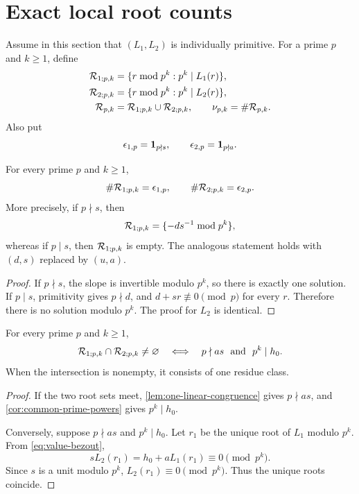 \section{Exact local root counts}
\label{sec:local-root-counts}

Assume in this section that \((L_1,L_2)\) is individually primitive.
For a prime \(p\) and \(k\ge1\), define
\begin{align}
 \mathcal R_{1;p,k}
 &=
 \{r\bmod p^k:p^k\mid L_1(r)\},
\notag\\
 \mathcal R_{2;p,k}
 &=
 \{r\bmod p^k:p^k\mid L_2(r)\},
\notag\\
 \mathcal R_{p,k}
 &=\mathcal R_{1;p,k}\cup\mathcal R_{2;p,k},
 \qquad
 \nu_{p,k}=\#\mathcal R_{p,k}.
\label{eq:local-root-sets}
\end{align}
Also put
\[
 \epsilon_{1,p}=\mathbf 1_{p\nmid s},\qquad
 \epsilon_{2,p}=\mathbf 1_{p\nmid a}.
\]

\begin{lemma}
\label{lem:one-linear-congruence}
For every prime \(p\) and \(k\ge1\),
\[
 \#\mathcal R_{1;p,k}=\epsilon_{1,p},
 \qquad
 \#\mathcal R_{2;p,k}=\epsilon_{2,p}.
\]
More precisely, if \(p\nmid s\), then
\[
 \mathcal R_{1;p,k}
 =
 \{-ds^{-1}\bmod p^k\},
\]
whereas if \(p\mid s\), then \(\mathcal R_{1;p,k}\) is empty.  The
analogous statement holds with \((d,s)\) replaced by \((u,a)\).
\end{lemma}

\begin{proof}
If \(p\nmid s\), the slope is invertible modulo \(p^k\), so there is
exactly one solution.  If \(p\mid s\), primitivity gives
\(p\nmid d\), and \(d+sr\not\equiv0\pmod p\) for every \(r\).
Therefore there is no solution modulo \(p^k\).  The proof for
\(L_2\) is identical.
\end{proof}

\begin{lemma}
\label{lem:common-root-criterion}
For every prime \(p\) and \(k\ge1\),
\begin{equation}
 \mathcal R_{1;p,k}\cap\mathcal R_{2;p,k}\ne\varnothing
 \quad\Longleftrightarrow\quad
 p\nmid as\ \text{ and }\ p^k\mid h_0.
\label{eq:common-root-iff}
\end{equation}
When the intersection is nonempty, it consists of one residue class.
\end{lemma}

\begin{proof}
If the two root sets meet, \cref{lem:one-linear-congruence} gives
\(p\nmid as\), and \cref{cor:common-prime-powers} gives
\(p^k\mid h_0\).

Conversely, suppose \(p\nmid as\) and \(p^k\mid h_0\).  Let
\(r_1\) be the unique root of \(L_1\) modulo \(p^k\).  From
\eqref{eq:value-bezout},
\[
 sL_2(r_1)=h_0+aL_1(r_1)\equiv0\pmod{p^k}.
\]
Since \(s\) is a unit modulo \(p^k\), \(L_2(r_1)\equiv0\pmod{p^k}\).
Thus the unique roots coincide.
\end{proof}

